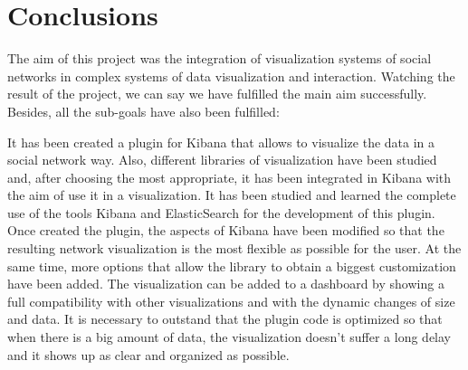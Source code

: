 \documentclass[a4paper, 12pt]{book}
\begin{document}

\cleardoublepage
\chapter{Conclusions}
\label{chap:conclusions}
The aim of this project was the integration of visualization systems of social networks in complex systems of data visualization and interaction. Watching the result of the project, we can say we have fulfilled the main aim successfully. Besides, all the sub-goals have also been fulfilled:

It has been created a plugin for Kibana that allows to visualize the data in a social network way. Also, different libraries of visualization have been studied and, after choosing the most appropriate, it has been integrated in Kibana with the aim of use it in a visualization. It has been studied and learned the complete use of the tools Kibana and ElasticSearch for the development of this plugin. Once created the plugin, the aspects of Kibana have been modified so that the resulting network visualization is the most flexible as possible for the user. At the same time, more options that allow the library to obtain a biggest customization have been added. The visualization can be added to a dashboard by showing a full compatibility with other visualizations and with the dynamic changes of size and data. It is necessary to outstand that the plugin code is optimized so that when there is a big amount of data, the visualization doesn’t suffer a long delay and it shows up as clear and organized as possible.\\
\end{document}
